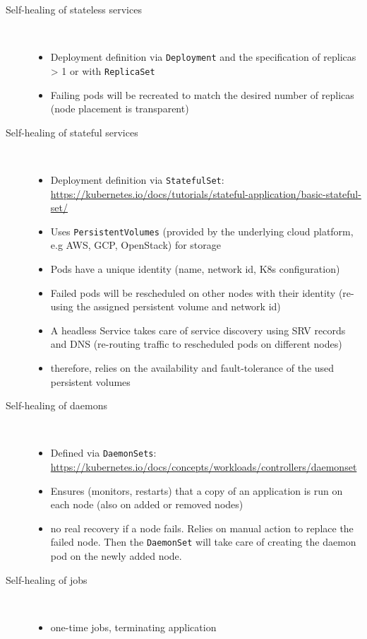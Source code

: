   \begin{description}
    \item[Self-healing of stateless services]\hfill\\
      \begin{itemize}
        \item Deployment definition via \texttt{Deployment} and the specification of replicas > 1 or with \texttt{ReplicaSet}
        \item Failing pods will be recreated to match the desired number of replicas (node placement is transparent)
      \end{itemize}

    \item[Self-healing of stateful services]\hfill\\
      \begin{itemize}
        \item Deployment definition via \texttt{StatefulSet}: \url{https://kubernetes.io/docs/tutorials/stateful-application/basic-stateful-set/}
        \item  Uses \texttt{PersistentVolumes} (provided by the underlying cloud platform, e.g AWS, GCP, OpenStack) for storage
        \item Pods have a unique identity (name, network id, K8s configuration)
        \item Failed pods will be rescheduled on other nodes with their identity (re-using the assigned persistent volume and network id)
        \item A headless Service takes care of service discovery using SRV records and DNS (re-routing traffic to rescheduled pods on different nodes)
        \item therefore, relies on the availability and fault-tolerance of the used persistent volumes
      \end{itemize}

    \item[Self-healing of daemons]\hfill\\
      \begin{itemize}
        \item Defined via \texttt{DaemonSets}: \url{https://kubernetes.io/docs/concepts/workloads/controllers/daemonset}
        \item Ensures (monitors, restarts) that a copy of an application is run on each node (also on added or removed nodes)
        \item no real recovery if a node fails. Relies on manual action to replace the failed node. Then the \texttt{DaemonSet} will take care of creating the daemon pod on the newly added node.
      \end{itemize}

    \item[Self-healing of jobs]\hfill\\
      \begin{itemize}
        \item one-time jobs, terminating application
      \end{itemize}
  \end{description}

